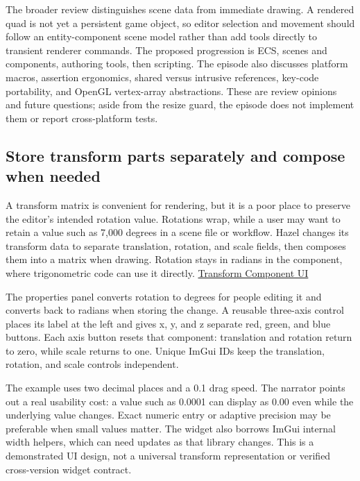 The broader review distinguishes scene data from immediate drawing. A rendered quad is not yet a persistent game object, so editor selection and movement should follow an entity-component scene model rather than add tools directly to transient renderer commands. The proposed progression is ECS, scenes and components, authoring tools, then scripting. The episode also discusses platform macros, assertion ergonomics, shared versus intrusive references, key-code portability, and OpenGL vertex-array abstractions. These are review opinions and future questions; aside from the resize guard, the episode does not implement them or report cross-platform tests.

\subsection{Store transform parts separately and compose when needed}\label{06-engine-ii-ch032-store-transform-parts-separately-and-compose-when-needed}

\hypertarget{06-engine-ii-ch032-store-transform-parts-separately-and-compose-when-needed}{}

A transform matrix is convenient for rendering, but it is a poor place to preserve the editor's intended rotation value. Rotations wrap, while a user may want to retain a value such as 7,000 degrees in a scene file or workflow. Hazel changes its transform data to separate translation, rotation, and scale fields, then composes them into a matrix when drawing. Rotation stays in radians in the component, where trigonometric code can use it directly. \href{https://www.youtube.com/watch?v=8JqcXYbzPJc}{Transform Component UI}

The properties panel converts rotation to degrees for people editing it and converts back to radians when storing the change. A reusable three-axis control places its label at the left and gives x, y, and z separate red, green, and blue buttons. Each axis button resets that component: translation and rotation return to zero, while scale returns to one. Unique ImGui IDs keep the translation, rotation, and scale controls independent.

The example uses two decimal places and a 0.1 drag speed. The narrator points out a real usability cost: a value such as 0.0001 can display as 0.00 even while the underlying value changes. Exact numeric entry or adaptive precision may be preferable when small values matter. The widget also borrows ImGui internal width helpers, which can need updates as that library changes. This is a demonstrated UI design, not a universal transform representation or verified cross-version widget contract.

